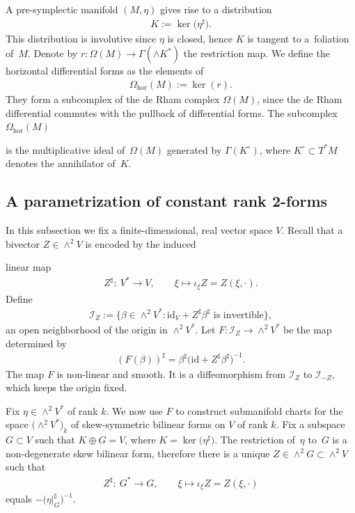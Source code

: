 \documentclass[10pt,a4paper]{amsart}
\numberwithin{equation}{section}
\newcommand{\hor}{\mathrm{hor}}
\newcommand{\id}{\mathrm{id}}
\begin{document}
A pre-symplectic manifold $(M,\eta)$ gives rise to a distribution
\begin{gather*}K:=\ker\big(\eta^\sharp\big).\end{gather*}
This distribution is involutive since $\eta$ is closed, hence $K$ is tangent to a~foliation of~$M$. Denote by $r\colon \Omega(M) \to \Gamma(\wedge K^*)$ the restriction map. We define the horizontal differential forms as the elements of
\begin{gather*}\Omega_\hor(M):=\ker(r).\end{gather*}
They form a subcomplex of the de Rham complex ${\Omega(M)}$, since the de Rham differential commutes with the pullback of differential forms. The subcomplex $\Omega_\hor(M)$ {is the multiplicative ideal of~$\Omega(M)$ generated by $\Gamma(K^\circ)$, where $K^\circ \subset T^*M$ denotes the annihilator of~$K$.

\subsection{A parametrization of constant rank 2-forms}\label{subsection: Dirac parametrization}

In this subsection we fix a finite-dimensional, real vector space $V$. Recall that a bivector $Z\in \wedge^2 V$ is encoded by the induced} linear map
\begin{gather*}
Z^\sharp\colon \ V^* \to V, \qquad \xi \mapsto \iota_\xi Z = Z(\xi,\cdot).\end{gather*}
Define \begin{gather*} \mathcal{I}_Z:=\big\{\beta \in \wedge^2 V^*\colon \mathrm{id}_V + Z^\sharp \beta^\sharp \text{ is invertible}\big\},\end{gather*}
an open neighborhood of the origin in $\wedge^2 V^*$. Let $F \colon \mathcal{I}_Z\to \wedge^2 V^*$ be the map determined by
\begin{gather}\label{eq:alphabeta}
(F (\beta))^\sharp = \beta^\sharp\big(\id + Z^{\sharp}\beta^\sharp\big)^{-1}.
\end{gather}
The map $F$ is non-linear and smooth. It is a diffeomorphism from $\mathcal{I}_{Z}$ to $\mathcal{I}_{-Z}$, which keeps the origin fixed.

Fix $\eta \in \wedge^2 V^*$ of rank $k$. We now use $F$ to construct submanifold charts for the space $\big({\wedge}^2V^*\big)_k$ of skew-symmetric bilinear forms on $V$ of rank $k$. Fix a subspace $G\subset V$ such that $K\oplus G=V$, where $K=\ker\big(\eta^\sharp\big)$. The restriction of~$\eta$ to~$G$ is a non-degenerate skew bilinear form, therefore there is a unique $Z \in \wedge^2 G \subset\wedge^2 V$ such that
\begin{gather*} Z^\sharp\colon \ G^*\to G, \qquad \xi \mapsto \iota_\xi Z=Z(\xi,\cdot)\end{gather*}
equals $-\big(\eta\vert_G^\sharp\big)^{-1}$.
\end{document}
